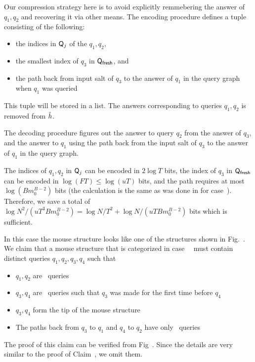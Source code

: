 {Our compression strategy here is to avoid explicitly remmebering the answer of $q_1,q_2$ and recovering it via other means. The encoding procedure defines a tuple consisting of the following:
\begin{itemize}
\item the indices in $\mathsf{Q}_j$ of the $q_1,q_2$,
\item the smallest index of $q_3$ in $\mathsf{Q}_\textsf{fresh}$, and
\item the path back from input salt of $q_3$ to the answer of $q_1$ in the query graph when $q_1$ was queried
\end{itemize}
This tuple will be stored in a list. The answers corresponding to queries $q_1,q_2$ is removed from $\tilde{h}$.

The decoding procedure figures out the answer to query $q_2$ from the answer of $q_3$, and the answer to $q_1$ using the path back from the input salt of $q_3$ to the answer of $q_1$ in the query graph.
\unfammousefig


The indices of $q_1,q_2$ in $\mathsf{Q}_j$ can be encoded in $2\log T$ bits, the index of $q_3$ in $\mathsf{Q}_\textsf{fresh}$ can be encoded in $\log (FT)\leq \log (uT)$ bits, and the path requires at most $\log (Bm_0^{B-2})$ bits (the calculation is the same as was done in  for case~). Therefore, we save a total of $\log N^2/(uT^3Bm_0^{B-2})=\log N/T^2+\log N/(uTBm_0^{B-2})$ bits which is sufficient.


In this case the mouse structure looks like one of the structures shown in Fig.~. We claim that a mouse structure that is categorized in case~~ must contain distinct queries $q_1,q_2,q_3,q_4$  such that
\begin{itemize}
\item $q_1,q_2$ are \new\ queries
\item $q_3,q_4$ are \urep\ queries such that $q_3$ was made for the first time before $q_4$
\item $q_3,q_4$ form the tip of the mouse structure
\item The paths back from $q_3$ to $q_1$ and $q_4$ to $q_2$ have only \urep\ queries
\end{itemize}
The proof of this claim can be verified from Fig~. Since the details are very similar to the proof of Claim~, we omit them.

}
